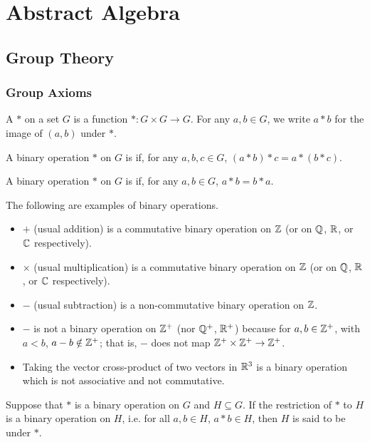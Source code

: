 \part{Abstract Algebra}
\chapter{Group Theory}
\section{Group Axioms}
\begin{definition}
A  $\ast$ on a set $G$ is a function $\ast:G\times G\to G$. For any $a,b\in G$, we write $a \ast b$ for the image of $(a,b)$ under $\ast$.

A binary operation $\ast$ on $G$ is  if, for any $a,b,c\in G$, $(a \ast b) \ast c = a \ast (b \ast c)$.

A binary operation $\ast$ on $G$ is  if, for any $a, b \in G$, $a \ast b = b \ast a$.
\end{definition}

\begin{example}
The following are examples of binary operations.
\begin{itemize}
\item $+$ (usual addition) is a commutative binary operation on $\mathbb Z$ (or on $\mathbb Q$, $\mathbb R$, or $\mathbb C$ respectively).
\item $\times$ (usual multiplication) is a commutative binary operation on $\mathbb Z$ (or on $\mathbb Q$, $\mathbb R$, or $\mathbb C$ respectively).
\item $-$ (usual subtraction) is a non-commutative binary operation on $\mathbb Z$.
\item $-$ is not a binary operation on $\mathbb Z^+$ (nor $\mathbb Q^+$, $\mathbb R^+$) because for $a,b\in\mathbb Z^+$, with $a<b$, $a-b\notin\mathbb Z^+$; that is, $-$ does not map $\mathbb Z^+\times\mathbb Z^+\to\mathbb Z^+$.
\item Taking the vector cross-product of two vectors in $\mathbb R^3$ is a binary operation which is not associative and not commutative.
\end{itemize}
\end{example}

Suppose that $\ast$ is a binary operation on $G$ and $H\subseteq G$. If the restriction of $\ast$ to $H$ is a binary operation on $H$, i.e. for all $a,b\in H$, $a\ast b\in H$, then $H$ is said to be  under $\ast$.

